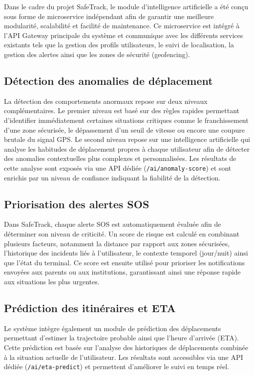 Dans le cadre du projet SafeTrack, le module d’intelligence artificielle a été conçu sous forme de microservice indépendant afin de garantir une meilleure modularité, scalabilité et facilité de maintenance. Ce microservice est intégré à l’API Gateway principale du système et communique avec les différents services existants tels que la gestion des profils utilisateurs, le suivi de localisation, la gestion des alertes ainsi que les zones de sécurité (geofencing).

\subsection{Détection des anomalies de déplacement}

La détection des comportements anormaux repose sur deux niveaux complémentaires. Le premier niveau est basé sur des règles rapides permettant d’identifier immédiatement certaines situations critiques comme le franchissement d’une zone sécurisée, le dépassement d’un seuil de vitesse ou encore une coupure brutale du signal GPS. Le second niveau repose sur une intelligence artificielle qui analyse les habitudes de déplacement propres à chaque utilisateur afin de détecter des anomalies contextuelles plus complexes et personnalisées. Les résultats de cette analyse sont exposés via une API dédiée (\texttt{/ai/anomaly-score}) et sont enrichis par un niveau de confiance indiquant la fiabilité de la détection.

\subsection{Priorisation des alertes SOS}

Dans SafeTrack, chaque alerte SOS est automatiquement évaluée afin de déterminer son niveau de criticité. Un score de risque est calculé en combinant plusieurs facteurs, notamment la distance par rapport aux zones sécurisées, l’historique des incidents liés à l’utilisateur, le contexte temporel (jour/nuit) ainsi que l’état du terminal. Ce score est ensuite utilisé pour prioriser les notifications envoyées aux parents ou aux institutions, garantissant ainsi une réponse rapide aux situations les plus urgentes.

\subsection{Prédiction des itinéraires et ETA}

Le système intègre également un module de prédiction des déplacements permettant d’estimer la trajectoire probable ainsi que l’heure d’arrivée (ETA). Cette prédiction est basée sur l’analyse des historiques de déplacements combinée à la situation actuelle de l’utilisateur. Les résultats sont accessibles via une API dédiée (\texttt{/ai/eta-predict}) et permettent d’améliorer le suivi en temps réel.

